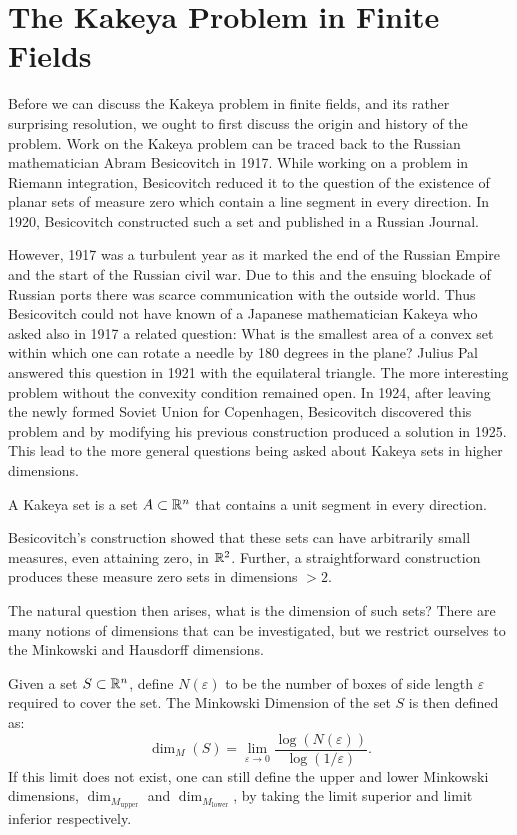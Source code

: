 \chapter{The Kakeya Problem in Finite Fields}
Before we can discuss the Kakeya problem in finite fields, and its rather surprising resolution, we ought to first discuss the origin and history of the problem. 
Work on the Kakeya problem can be traced back to the Russian mathematician Abram Besicovitch in 1917. While working on a problem in Riemann integration, Besicovitch reduced it to the question
of the existence of planar sets of measure zero which contain a line segment in every direction. In 1920, Besicovitch constructed such a set and published in a Russian Journal.

However, 1917 was a turbulent year as it marked the end of
the Russian Empire and the start of the Russian civil war. Due to this and the ensuing blockade of Russian ports there was scarce communication with the outside world.
Thus Besicovitch could not have known of a Japanese mathematician Kakeya who asked also in 1917 a related question: What is the smallest area of a convex set within which
one can rotate a needle by 180 degrees in the plane? Julius Pal answered this question in 1921 with the equilateral triangle. The 
more interesting problem without the convexity condition remained open. In 1924, after leaving the newly formed Soviet Union for Copenhagen, Besicovitch discovered this
problem and by modifying his previous construction produced a solution in 1925. This lead to the more general questions being asked about Kakeya sets in higher dimensions.
\begin{definition}
    A Kakeya set is a set $A \subset \mathbb R^n$ that contains a unit segment in every direction.
\end{definition}
Besicovitch's construction showed that these sets can have arbitrarily small measures, even attaining zero, in $\mathbb R^2$. Further, a straightforward construction produces these measure zero sets in dimensions $> 2$.

The natural question then arises, what is the dimension of such sets? There are many notions of dimensions that can be investigated, but we restrict ourselves to the Minkowski and Hausdorff dimensions.

\begin{definition}
Given a set $S \subset \mathbb R^n$, define $N(\varepsilon)$ to be the number of boxes of side length $\varepsilon$ required to cover the set.
The Minkowski Dimension of the set $S$ is then defined as:
$$\dim_M (S) = \lim_{\varepsilon \to 0} \frac{\log( N(\varepsilon))}{\log (1/\varepsilon)}.$$
If this limit does not exist, one can still define the upper and lower Minkowski dimensions, 
$\dim_{M_{\text{upper}}}$ and $\dim_{M_{\text{lower}}}$, by taking the limit superior and limit inferior respectively.

\end{definition}

